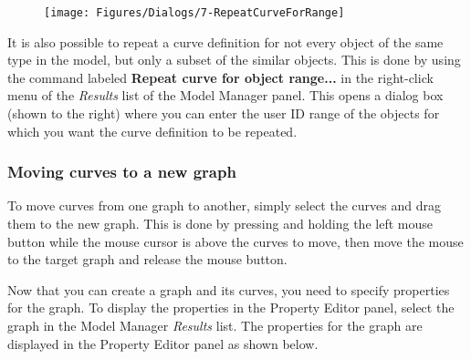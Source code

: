 \def\fwidth{0.3\textwidth}
\begin{figure}
  \vspace{-5mm}
  \texttt{[image: Figures/Dialogs/7-RepeatCurveForRange]}
\end{figure}

It is also possible to repeat a curve definition for not every object of the
same type in the model, but only a subset of the similar objects. This is done
by using the command labeled \textbf{Repeat curve for object range...}
in the right-click menu of the {\sl Results} list of the Model Manager panel.
This opens a dialog box (shown to the right) where you can enter the user ID
range of the objects for which you want the curve definition to be repeated.


\subsubsection{Moving curves to a new graph}

To move curves from one graph to another, simply select the curves and
drag them to the new graph. This is done by pressing and holding the
left mouse button while the mouse cursor is above the curves to move,
then move the mouse to the target graph and release the mouse button.






Now that you can create a graph and its curves, you need to specify properties
for the graph. To display the properties in the Property Editor panel,
select the graph in the Model Manager {\sl Results} list.
The properties for the graph are displayed in the Property Editor panel
as shown below.

